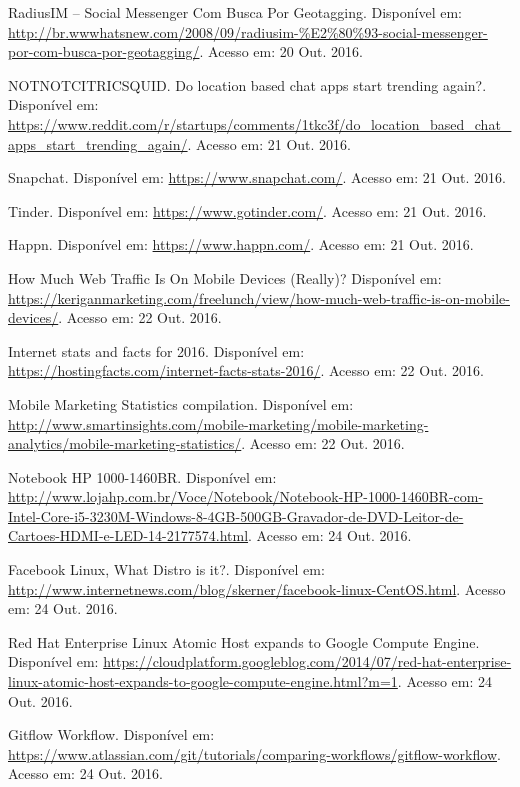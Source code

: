 \documentclass[brazil,ruledheader]{abntifes}
\begin{document}
\begin{thebibliography}{9}
		RadiusIM – Social Messenger Com Busca Por Geotagging. Disponível em: \url{http://br.wwwhatsnew.com/2008/09/radiusim-%E2%80%93-social-messenger-por-com-busca-por-geotagging/}.
			Acesso em: 20 Out. 2016.
			
		NOTNOTCITRICSQUID. Do location based chat apps start trending again?. Disponível em: \url{https://www.reddit.com/r/startups/comments/1tkc3f/do_location_based_chat_apps_start_trending_again/}.
		Acesso em: 21 Out. 2016.
		
		Snapchat. Disponível em: \url{https://www.snapchat.com/}.
		Acesso em: 21 Out. 2016.
		
		Tinder. Disponível em: \url{https://www.gotinder.com/}.
		Acesso em: 21 Out. 2016.
		
		Happn. Disponível em: \url{https://www.happn.com/}.
		Acesso em: 21 Out. 2016.
		
		How Much Web Traffic Is On Mobile Devices (Really)? Disponível em: \url{https://keriganmarketing.com/freelunch/view/how-much-web-traffic-is-on-mobile-devices/}.
		Acesso em: 22 Out. 2016.
		
		Internet stats and facts for 2016. Disponível em: \url{https://hostingfacts.com/internet-facts-stats-2016/}.
		Acesso em: 22 Out. 2016.
		
		Mobile Marketing Statistics compilation. Disponível em: \url{http://www.smartinsights.com/mobile-marketing/mobile-marketing-analytics/mobile-marketing-statistics/}.
		Acesso em: 22 Out. 2016.
		
		Notebook HP 1000-1460BR. Disponível em: \url{http://www.lojahp.com.br/Voce/Notebook/Notebook-HP-1000-1460BR-com-Intel-Core-i5-3230M-Windows-8-4GB-500GB-Gravador-de-DVD-Leitor-de-Cartoes-HDMI-e-LED-14-2177574.html}.
		Acesso em: 24 Out. 2016.
		
		Facebook Linux, What Distro is it?. Disponível em: \url{http://www.internetnews.com/blog/skerner/facebook-linux-CentOS.html}.
		Acesso em: 24 Out. 2016.
		
		Red Hat Enterprise Linux Atomic Host expands to Google Compute Engine. Disponível em: \url{https://cloudplatform.googleblog.com/2014/07/red-hat-enterprise-linux-atomic-host-expands-to-google-compute-engine.html?m=1}.
		Acesso em: 24 Out. 2016.
		
		Gitflow Workflow. Disponível em: \url{https://www.atlassian.com/git/tutorials/comparing-workflows/gitflow-workflow}.
		Acesso em: 24 Out. 2016.
		

\end{thebibliography}
\end{document}

